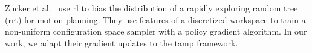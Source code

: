 Zucker et al.~\cite{workspacebias} use {\sc rl} to bias the
distribution of a rapidly exploring random tree ({\sc rrt}) for motion
planning. They use features of a discretized workspace to train a
non-uniform configuration space sampler with a policy gradient
algorithm.  In our work, we adapt their gradient updates to the {\sc
  tamp} framework.

